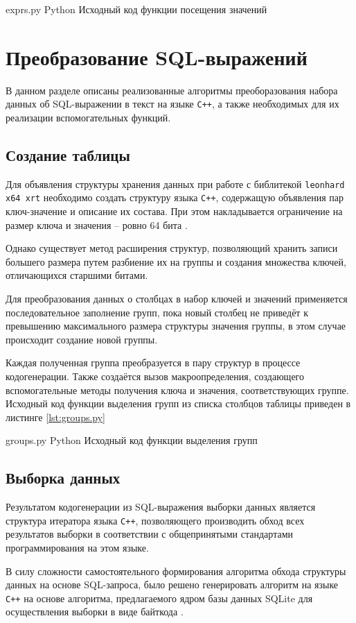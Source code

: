 {exprs.py}
{Python}
{Исходный код функции посещения значений}

\section{Преобразование SQL-выражений}
В данном разделе описаны реализованные алгоритмы преоборазования набора данных об SQL-выражении в текст на языке \texttt{C++}, а также необходимых для их реализации вспомогательных функций.

\subsection{Создание таблицы}
Для объявления структуры хранения данных при работе с библитекой \texttt{leonhard x64 xrt} необходимо создать структуру языка \texttt{C++}, содержащую объявления пар ключ-значение и описание их состава.
При этом накладывается ограничение на размер ключа и значения -- ровно 64 бита \cite{teragraph}.

Однако существует метод расширения структур, позволяющий хранить записи большего размера путем разбиение их на группы и создания множества ключей, отличающихся старшими битами.

Для преобразования данных о столбцах в набор ключей и значений применяется последовательное заполнение групп, пока новый столбец не приведёт к превышению максимального размера структуры значения группы, в этом случае происходит создание новой группы.

Каждая полученная группа преобразуется в пару структур в процессе кодогенерации.
Также создаётся вызов макроопределения, создающего вспомогательные методы получения ключа и значения, соответствующих группе.
Исходный код функции выделения групп из списка столбцов таблицы приведен в листинге \ref{lst:groups.py}

{groups.py}
{Python}
{Исходный код функции выделения групп}

\subsection{Выборка данных}
Результатом кодогенерации из SQL-выражения выборки данных является структура итератора языка \texttt{C++}, позволяющего производить обход всех результатов выборки в соответствии с общепринятыми стандартами программирования на этом языке.

В силу сложности самостоятельного формирования алгоритма обхода структуры данных на основе SQL-запроса, было решено генерировать алгоритм на языке \texttt{C++} на основе алгоритма, предлагаемого ядром базы данных SQLite для осуществления выборки в виде байткода \cite{sqlite_bytecode}.

